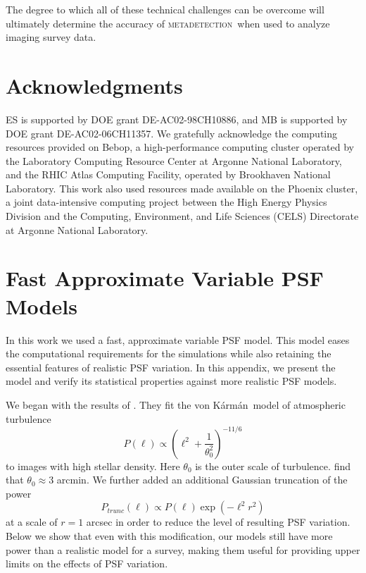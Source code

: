 \documentclass[iop, appendixfloats, numberedappendix, apj]{emulateapj}
\newcommand{\mdet}{\textsc{metadetection}}
\newcommand{\vonkarman}{{von K\'arm\'an}~}
\begin{document}
The degree to which all of these technical challenges can be overcome will
ultimately determine the accuracy of \mdet\ when used to analyze imaging survey
data.


\section*{Acknowledgments}

ES is supported by DOE grant DE-AC02-98CH10886, and MB is supported by DOE
grant DE-AC02-06CH11357.  We gratefully acknowledge the computing resources
provided on Bebop, a high-performance computing cluster operated by the
Laboratory Computing Resource Center at Argonne National Laboratory, and the
RHIC Atlas Computing Facility, operated by Brookhaven National Laboratory.
This work also used resources made available on the Phoenix cluster, a joint
data-intensive computing project between the High Energy Physics Division and
the Computing, Environment, and Life Sciences (CELS) Directorate at Argonne
National Laboratory.


%
%
%
%



\appendix

\section{Fast Approximate Variable PSF Models}\label{app:pspsf}

In this work we used a fast, approximate variable PSF model. This model eases the
computational requirements for the simulations while also retaining the
essential features of realistic PSF variation. In this appendix, we present
the model and verify its statistical properties against more realistic PSF models.

We began with the results of \citet{heymans2012}. They fit the \vonkarman model
of atmospheric turbulence
\begin{displaymath}
  P(\ell) \propto \left(\ell^{2} + \frac{1}{\theta_{0}^2}\right)^{-11/6}
\end{displaymath}
to images with high stellar density. Here $\theta_{0}$ is the outer scale of
turbulence. \citep{heymans2012} find that $\theta_{0}\approx3$ arcmin.
We further added an additional Gaussian truncation of the power
\begin{displaymath}
  P_{trunc}(\ell) \propto P(\ell)\exp\left(-\ell^2r^{2}\right)
\end{displaymath}
at a scale of $r=1$ arcsec in order to reduce the level of resulting
PSF variation. Below we show that even with this modification, our models
still have more power than a realistic model for a survey, making them useful
for providing upper limits on the effects of PSF variation.
\end{document}
